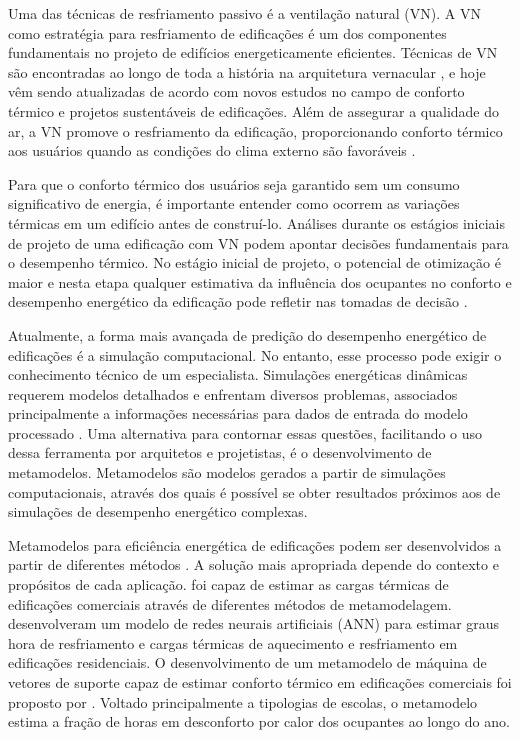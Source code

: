 \documentclass[brazil,hardcopy,openany,a5paper]{ufscthesis}
\begin{document}
	Uma das técnicas de resfriamento passivo é a ventilação natural (VN). A VN como estratégia para resfriamento de edificações é um dos componentes fundamentais no projeto de edifícios energeticamente eficientes. Técnicas de VN são encontradas ao longo de toda a história na arquitetura vernacular  \cite{Pesic2018}, e hoje vêm sendo atualizadas de acordo com novos estudos no campo de conforto térmico e projetos sustentáveis de edificações. Além de assegurar a qualidade do ar, a VN promove o resfriamento da edificação, proporcionando conforto térmico aos usuários quando as condições do clima externo são favoráveis \cite{Yao2009}.
	
	Para que o conforto térmico dos usuários seja garantido sem um consumo significativo de energia, é importante entender como ocorrem as variações térmicas em um edifício antes de construí-lo. Análises durante os estágios iniciais de projeto de uma edificação com VN podem apontar decisões fundamentais para o desempenho térmico. No estágio inicial de projeto, o potencial de otimização é maior e nesta etapa qualquer estimativa da influência dos ocupantes no conforto e desempenho energético da edificação pode refletir nas tomadas de decisão \cite{Belleri2014, Roetzel2014}.
	
	Atualmente, a forma mais avançada de predição do desempenho energético de edificações é a simulação computacional. No entanto, esse processo pode exigir o conhecimento técnico de um especialista. Simulações energéticas dinâmicas requerem modelos detalhados e enfrentam diversos problemas, associados principalmente a informações necessárias para dados de entrada do modelo processado \cite{Corgnati2013}. Uma alternativa para contornar essas questões, facilitando o uso dessa ferramenta por arquitetos e projetistas, é o desenvolvimento de metamodelos. Metamodelos são modelos gerados a partir de simulações computacionais, através dos quais é possível se obter resultados próximos aos de simulações de desempenho energético complexas.
	
	Metamodelos para eficiência energética de edificações podem ser desenvolvidos a partir de diferentes métodos \cite{Ostergard2018}. A solução mais apropriada depende do contexto e propósitos de cada aplicação.
	 \cite{Versage2015} foi capaz de estimar as cargas térmicas de edificações comerciais através de diferentes métodos de metamodelagem.
	 \cite{Melo2016} desenvolveram um modelo de redes neurais artificiais (ANN) para estimar graus hora de resfriamento e cargas térmicas de aquecimento e resfriamento em edificações residenciais.
	O desenvolvimento de um metamodelo de máquina de vetores de suporte capaz de estimar conforto térmico em edificações comerciais foi proposto por  \cite{Rackes2016}. Voltado principalmente a tipologias de escolas, o metamodelo estima a fração de horas em desconforto por calor dos ocupantes ao longo do ano.
	
\end{document}
